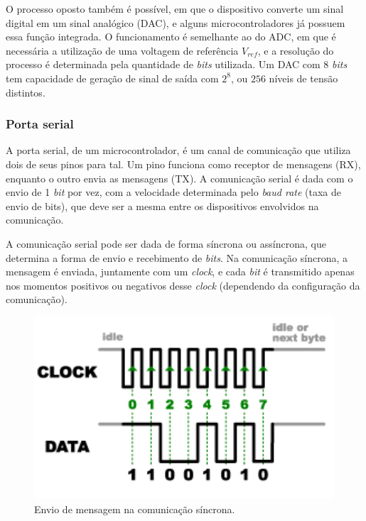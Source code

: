 O processo oposto também é possível, em que o dispositivo converte um sinal digital em um sinal analógico (\ac{DAC}), e alguns microcontroladores já possuem essa função integrada. O funcionamento é semelhante ao do \ac{ADC}, em que é necessária a utilização de uma voltagem de referência \(V_{ref}\), e a resolução do processo é determinada pela quantidade de \textit{bits} utilizada. Um \ac{DAC} com 8 \textit{bits} tem capacidade de geração de sinal de saída com \( 2^8 \), ou \(256\) níveis de tensão distintos\cite{DAC}.

\subsubsection{Porta serial}

A porta serial, de um microcontrolador, é um canal de comunicação que utiliza dois de seus pinos para tal. Um pino funciona como receptor de mensagens (\ac{RX}), enquanto o outro envia as mensagens (\ac{TX}). A comunicação serial é dada com o envio de 1 \textit{bit} por vez, com a velocidade determinada pelo \textit{baud rate} (taxa de envio de bits), que deve ser a mesma entre os dispositivos envolvidos na comunicação.

A comunicação serial pode ser dada de forma síncrona ou assíncrona, que determina a forma de envio e recebimento de \textit{bits}. Na comunicação síncrona, a mensagem é enviada, juntamente com um \textit{clock}, e cada \textit{bit} é transmitido apenas nos momentos positivos ou negativos desse \textit{clock} (dependendo da configuração da comunicação).

\begin{figure}[ht]
    \begin{center}
    \includegraphics{figuras/sincrono.PNG}
    \end{center}
    \caption[Comunicação síncrona]{Envio de mensagem na comunicação síncrona.}
    \label{sincrono}
\end{figure}

